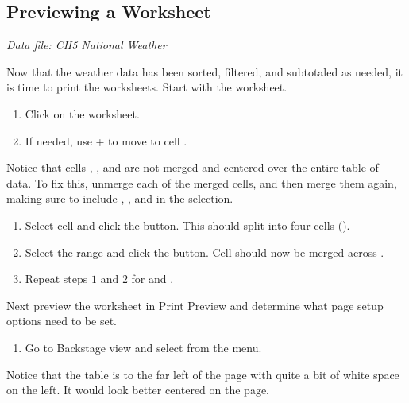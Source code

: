 \subsection{Previewing a Worksheet}

\textit{Data file: CH5 National Weather}

Now that the weather data has been sorted, filtered, and subtotaled as needed, it is time to print the worksheets. Start with the  worksheet.

\begin{enumerate}
	\item Click on the  worksheet. 
	\item If needed, use + to move to cell .
\end{enumerate}

Notice that cells , , and  are not merged and centered over the entire table of data. To fix this, unmerge each of the merged cells, and then merge them again, making sure to include , , and  in the selection.

\begin{enumerate}
	\item Select cell  and click the  button. This should split  into four cells ().
	\item Select the range  and click the  button. Cell  should now be merged across .
	\item Repeat steps $ 1 $ and $ 2 $ for  and .
\end{enumerate}

Next preview the worksheet in Print Preview and determine what page setup options need to be set.

\begin{enumerate}
	\item Go to Backstage view and select  from the menu.
\end{enumerate}

Notice that the table is to the far left of the page with quite a bit of white space on the left. It would look better centered on the page.

